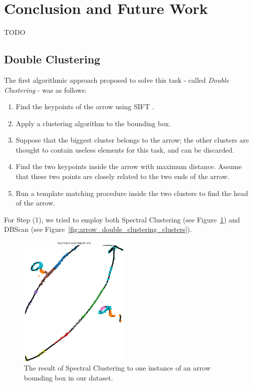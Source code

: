 \documentclass[conference]{IEEEtran}
\begin{document}
\section{Conclusion and Future Work}
TODO

\newpage


\newpage

\begin{appendices}

\section{Double Clustering}
\label{double_clustering}
The first algorithmic approach proposed to solve this task - called \textit{Double Clustering} - was as follows: 
\begin{enumerate}
	\item Find the keypoints of the arrow using SIFT \cite{SIFT}.
	\item Apply a clustering algorithm to the bounding box.
	\item Suppose that the biggest cluster belongs to the arrow; the other clusters are thought to contain useless elements for this task, and can be discarded.
	\item Find the two keypoints inside the arrow with maximum distance. Assume that these two points are closely related to the two ends of the arrow.
	\item Run a template matching procedure inside the two clusters to find the head of the arrow.
\end{enumerate}

For Step (1), we tried to employ both Spectral Clustering \cite{spectralclustering} (see Figure~\ref{fig:spectral_clustering}) and DBScan \cite{dbscan} (see Figure~\ref{fig:arrow_double_clustering_clusters}).

\begin{figure}[H]
	\centering
	\includegraphics[width=150pt]{spectral_clustering.png}
	\caption{The result of Spectral Clustering to one instance of an arrow bounding box in our dataset.}
	\label{fig:spectral_clustering}
\end{figure}


\end{appendices}
\end{document}
